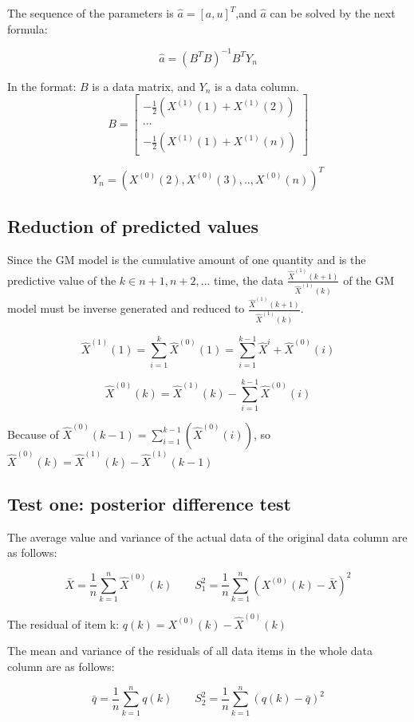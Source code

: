 \documentclass[a4paper]{article}
\begin{document}
The sequence of the parameters is $\hat{a} = [a,u]^{T}$,and $\hat{a}$ can be solved by the next formula:

\[\hat{a} = (B^{T}B)^{-1}B^{T}Y_{n}\]

In the format: $B$ is a data matrix, and $Y_n$ is a data column.
\[
B = 
\begin{bmatrix}
-\frac{1}{2}(X^{(1)}(1)+X^{(1)}(2)) \\
\cdots \\
-\frac{1}{2}(X^{(1)}(1)+X^{(1)}(n))

\end{bmatrix}
\]

\[
Y_n = (X^{(0)}(2), X^{(0)}(3), .., X^{(0)}(n))^{T}
\]

\subsection{Reduction of predicted values}
Since the GM model is the cumulative amount of one quantity and is the predictive value of the $k \in{n+1, n+2, ...}$ time, the data $\frac{\hat{X}^{(1)}(k+1)}{\hat{X}^{(1)}(k)}$ of the GM model must be inverse generated and reduced to $\frac{\hat{X}^{(1)}(k+1)}{\hat{X}^{(1)}(k)}$.

\[\hat{X}^{(1)}(1) = \sum_{i=1}^{k}{\hat{X}^{(0)}(1)} = \sum_{i=1}^{k-1}{\hat{X}^{i} + \hat{X}^{(0)}(i)}\]

\[\hat{X}^{(0)}(k) = \hat{X}^{(1)}(k) - \sum_{i=1}^{k-1}{\hat{X}^{(0)}(i)}\]

Because of $\hat{X}^{(0)}(k-1) = \sum_{i=1}^{k-1}(\hat{X}^{(0)}(i))$, so $\hat{X}^{(0)}(k) = \hat{X}^{(1)}(k) - \hat{X}^{(1)}(k-1)$

\subsection{Test one: posterior difference test}

The average value and variance of the actual data of the original data column are as follows:

\[\bar{X} = \frac{1}{n}\sum_{k=1}^{n}{\hat{X}^{(0)}(k)}\qquad S_{1}^{2} = \frac{1}{n}\sum_{k=1}^{n}({X^{(0)}(k) - \bar{X}})^{2}\]

The residual of item k: $q(k) = X^{(0)}(k) - \hat{X}^{(0)}(k)$

The mean and variance of the residuals of all data items in the whole data column are as follows:

\[\bar{q} = \frac{1}{n} \sum_{k=1}^{n}{q(k)} \qquad S_{2}^{2} = \frac{1}{n} \sum_{k=1}^{n}(q(k) - \bar{q})^{2}\]
\end{document}
